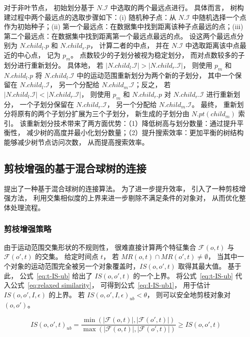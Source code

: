 对于非叶节点， 初始划分基于 $N.\mathcal{I}$ 中选取的两个最远点进行。 具体而言， 树构建过程中两个最远点的选取步骤如下：(i) 随机种子点：从 $N.\mathcal{I}$ 中随机选择一个点作为初始种子；(ii) 第一个最远点：在数据集中找到距离该种子点最远的点；(iii) 第二个最远点：在数据集中找到距离第一个最远点最远的点。 设这两个最远点分别为 $N.child_l.p$ 和 $N.child_r.p$， 计算二者的中点， 并在 $N.\mathcal{I}$ 中选取距离该中点最近的中心点， 记为 $p_m$。 点数较少的子划分被视为稳定划分， 而对点数较多的子划分进行重新划分。 具体地， 若 $|N.child_l.\mathcal{I}|>|N.child_r.\mathcal{I}|$， 则使用 $p_m$ 和 $N.child_l.p$ 将 $N.child_l.\mathcal{I}$ 中的运动范围重新划分为两个新的子划分， 其中一个保留在 $N.child_l.\mathcal{I}$， 另一个分配给 $N.child_m.\mathcal{I}$；反之， 若 $|N.child_l.\mathcal{I}|<|N.child_r.\mathcal{I}|$， 则使用 $p_m$ 和 $N.child_r.p$ 对 $N.child_r.\mathcal{I}$ 进行重新划分， 一个子划分保留在 $N.child_r.\mathcal{I}$， 另一个分配给 $N.child_m.\mathcal{I}$。 最终， 重新划分将原有的两个子划分扩展为三个子划分， 新生成的子划分由 $N.pt(child_m)$ 索引。 该重新划分技术带来了两方面优势：（1）降低树高与划分数量：通过提升平衡性， 减少树的高度并最小化划分数量；（2）提升搜索效率：更加平衡的树结构能够减少树节点访问次数， 从而提高搜索效率。
\subsection{剪枝增强的基于混合球树的连接}
提出了一种基于混合球树的连接算法。 为了进一步提升效率， 引入了一种剪枝增强方法， 利用交集相似度的上界来进一步剔除不满足条件的对象对， 从而优化整体处理流程。

\subsubsection*{剪枝增强策略}
由于运动范围交集形状的不规则性， 很难直接计算两个特征集合 $\mathcal{F}(o,t)$ 与 $\mathcal{F}(o',t)$ 的交集。 给定时间点 $t$， 若 $MR(o,t)\cap MR(o',t)\neq \emptyset$， 当其中一个对象的运动范围完全被另一个对象覆盖时，$IS(o,o',t)$ 取得其最大值。 基于此， 公式~\eqref{eq:t-IS-ub} 给出了 $IS(o,o',t)$ 的一个上界。 将公式~\eqref{eq:t-IS-ub} 代入公式~\eqref{eq:relaxed similarity}， 可得到公式~\eqref{eq:I-IS-ub1}， 用于估计 $IS(o,o',I,\epsilon)$ 的上界。 若 $IS(o,o',I,\epsilon)_{ub}<\theta$， 则可以安全地剪枝对象对 $(o,o')$。

    \begin{equation}
    \label{eq:t-IS-ub}
    IS(o,o',t)_{ub} =
   \frac{\min(|\mathcal{F}(o,t)|,|\mathcal{F}(o',t)|)}{\max(|\mathcal{F}(o,t)|,|\mathcal{F}(o',t)|)}\ge IS(o,o',t)
\end{equation}


